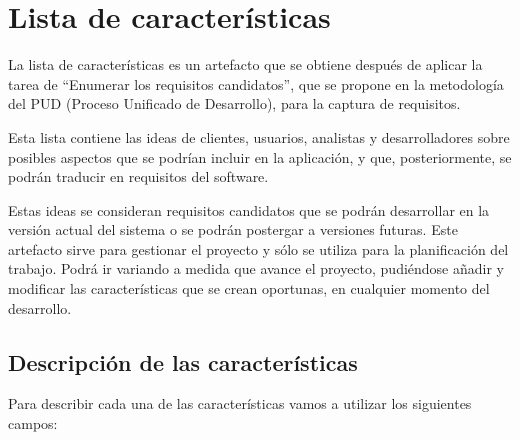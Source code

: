 \documentclass[a4paper,oneside,11pt]{book}
\begin{document}
\section{Lista de características}
La lista de características es un artefacto que se obtiene después de aplicar la tarea de “Enumerar los requisitos candidatos”, que se propone en la metodología del PUD (Proceso Unificado de Desarrollo), para la captura de requisitos. 
	
	Esta lista contiene las ideas de clientes, usuarios, analistas y desarrolladores sobre posibles aspectos que se podrían incluir en la aplicación, y que, posteriormente, se podrán traducir en requisitos del software. 

	Estas ideas se consideran requisitos candidatos que se podrán desarrollar en la versión actual del sistema o se podrán postergar a versiones futuras. Este artefacto sirve para gestionar el proyecto y sólo se utiliza para la planificación del trabajo. Podrá ir variando a medida que avance el proyecto, pudiéndose añadir y modificar las características que se crean oportunas, en cualquier momento del desarrollo.

\subsection{Descripción de las características}
Para describir cada una de las características vamos a utilizar los siguientes campos:
\end{document}
